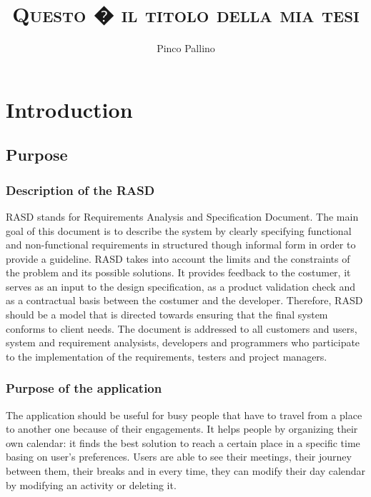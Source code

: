 \documentclass[12pt,titlepage]{article}
\title{\textsc{Questo � il titolo della mia tesi}}
\author{Pinco Pallino}
\begin{document}


\maketitle

\tableofcontents

\section{Introduction} \label{introduzione}

\subsection{Purpose} \label{sec:purpose}

\medskip
\subsubsection{Description of the RASD}\label{RASD}
RASD stands for Requirements Analysis and Specification Document.
The main goal of this document is to describe the system by clearly specifying functional and non-functional requirements in structured though informal form in order to provide a guideline.
RASD takes into account the limits and the constraints of the problem and its possible solutions. 
It provides feedback to the costumer, it serves as an input to the design specification, as a product validation check and as a contractual basis between the costumer and the developer.
Therefore, RASD should be a model that is directed towards ensuring that the final system conforms to client needs.
The document is addressed to all customers and users, system and requirement analysists, developers and programmers who participate to the implementation of the requirements, testers and project managers.

\subsubsection{Purpose of the application}\label{RASD}
The application should be useful for busy people that have to travel from a place to another one because of their engagements. It helps people by organizing their own calendar: it finds the best solution to reach a certain place in a specific time basing on user's preferences. 
Users are able to see their meetings, their journey between them, their breaks and in every time, they can modify their day calendar by modifying an activity or deleting it.
\end{document}
